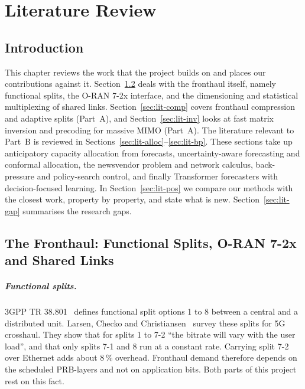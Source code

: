 \chapter{Literature Review}
\label{ch:lit}
\thispagestyle{plain}

\section{Introduction}

This chapter reviews the work that the project builds on and places our contributions against it. Section~\ref{sec:lit-fh} deals with the fronthaul itself, namely functional splits, the O-RAN 7-2x interface, and the dimensioning and statistical multiplexing of shared links. Section~\ref{sec:lit-comp} covers fronthaul compression and adaptive splits (Part~A), and Section~\ref{sec:lit-inv} looks at fast matrix inversion and precoding for massive MIMO (Part~A). The literature relevant to Part~B is reviewed in Sections~\ref{sec:lit-alloc}--\ref{sec:lit-bp}. These sections take up anticipatory capacity allocation from forecasts, uncertainty-aware forecasting and conformal allocation, the newsvendor problem and network calculus, back-pressure and policy-search control, and finally Transformer forecasters with decision-focused learning. In Section~\ref{sec:lit-pos} we compare our methods with the closest work, property by property, and state what is new. Section~\ref{sec:lit-gap} summarises the research gaps.

\section{The Fronthaul: Functional Splits, O-RAN 7-2x and Shared Links}
\label{sec:lit-fh}

\paragraph{Functional splits.} 3GPP TR 38.801~\cite{tr38801} defines functional split options 1 to 8 between a central and a distributed unit. Larsen, Checko and Christiansen~\cite{larsen2019} survey these splits for 5G crosshaul. They show that for splits 1 to 7-2 ``the bitrate will vary with the user load'', and that only splits 7-1 and 8 run at a constant rate. Carrying split 7-2 over Ethernet adds about 8\,\% overhead. Fronthaul demand therefore depends on the scheduled PRB-layers and not on application bits. Both parts of this project rest on this fact.

